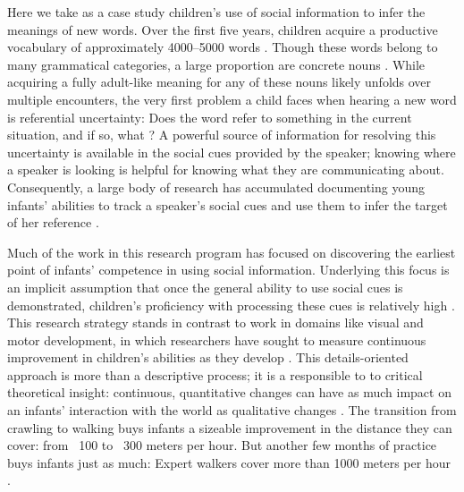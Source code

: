 \documentclass{pnastwo}
\begin{document}
\begin{article}

Here we take as a case study children's use of social information to infer the meanings of new words. Over the first five years, children acquire a productive vocabulary of approximately 4000--5000 words \citep{goulden1990}. Though these words belong to many grammatical categories, a large proportion are concrete nouns \citep{bates1994}. While acquiring a fully adult-like meaning for any of these nouns likely unfolds over multiple encounters, the very first problem a child faces when hearing a new word is referential uncertainty: Does the word refer to something in the current situation, and if so, what \citep{carey1978, yu2007, frank2009}? A powerful source of information for resolving this uncertainty is available in the social cues provided by the speaker; knowing where a speaker is looking is helpful for knowing what they are communicating about. Consequently, a large body of research has accumulated documenting young infants' abilities to track a speaker's social cues and use them to infer the target of her reference \citep[e.g.][]{scaife1975, baldwin1993, hollich2000, senju2008}.

Much of the work in this research program has focused on discovering the earliest point of infants' competence in using social information. Underlying this focus is an implicit assumption that once the general ability to use social cues is demonstrated, children's proficiency with processing these cues is relatively high \citep[e.g.][]{corkum1998, brooks2005, csibra2009}. This research strategy stands in contrast to work in domains like visual and motor development, in which researchers have sought to measure continuous improvement in children's abilities as they develop \citep{sokol1978, banks1980, forssberg1991, thelen1995}. This details-oriented approach is more than a descriptive process; it is a responsible to to critical theoretical insight: continuous, quantitative changes can have as much impact on an infants' interaction with the world as qualitative changes \cite{adolph2015}. The transition from crawling to walking buys infants a sizeable improvement in the distance they can cover: from ~100 to ~300 meters per hour. But another few months of practice buys infants just as much: Expert walkers cover more than 1000 meters per hour \cite{adolph2012}.


\end{article}
\end{document}
